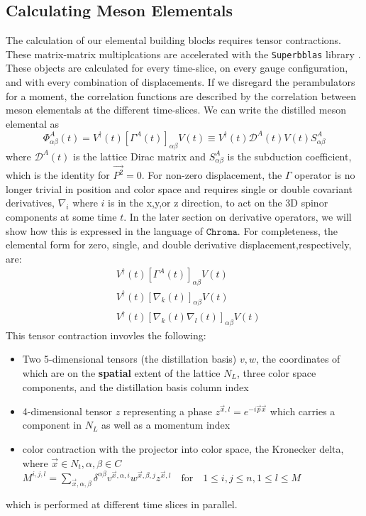 \subsection{Calculating Meson Elementals}
The calculation of our elemental building blocks requires tensor contractions. These matrix-matrix multiplcations are accelerated with the \texttt{Superbblas} library \cite{dinapoli2013efficientuseblaslibrary}. These objects are calculated for every time-slice, on every gauge configuration, and with every combination of displacements. If we disregard the perambulators for a moment, the correlation functions are described by the correlation between meson elementals at the different time-slices. We can write the distilled meson elemental as 
\begin{equation}
\Phi^A_{\alpha\beta}(t) = V^{\dagger}(t) [\Gamma^A(t)]_{\alpha\beta} V(t) \equiv V^{\dagger}(t)\mathcal{D}^A(t)V(t)S^A_{\alpha\beta}
\end{equation} where $\mathcal{D}^A(t)$ is the lattice Dirac matrix and $S^A_{\alpha\beta}$ is the subduction coefficient, which is the identity for $\vec{P^2} = 0$.
For non-zero displacement, the $\Gamma$ operator is no longer trivial in position and color space and requires single or double covariant derivatives, $\nabla_i$ where $i$ is in the x,y,or z direction, to act on the 3D spinor components at some time $t$. In the later section on derivative operators, we will show how this is expressed in the language of $\texttt{Chroma}$. For completeness, the elemental form for zero, single, and double derivative displacement,respectively, are: 
\begin{eqnarray}
  & V^{\dagger}(t) [\Gamma^A(t)]_{\alpha\beta} V(t) \\ 
  & V^{\dagger}(t) [\nabla_k(t)]_{\alpha\beta} V(t) \\ 
  & V^{\dagger}(t) [\nabla_k(t)\nabla_l(t)]_{\alpha\beta} V(t)
\end{eqnarray}
This tensor contraction invovles the following\cite{romero_efficient_2020}: 
\begin{itemize}
  \item Two 5-dimensional tensors (the distillation basis) $v,w$, the coordinates of which are on the \textbf{spatial} extent of the lattice $N_L$, three color space components, and the distillation basis column index 
  \item  4-dimensional tensor $z$ representing a phase $z^{\vec{x},l} = e^{-i\vec{p}\vec{x}}$ which carries a component in $N_L$ as well as a momentum index
  \item color contraction with the projector into color space, the Kronecker delta, where $\vec{x}\in N_t,\alpha,\beta \in C$
  \subitem $ M^{i,j,l} = \sum_{\vec{x},\alpha,\beta} \delta^{\alpha\beta} v^{\vec{x},\alpha,i}w^{\vec{x},\beta,j} z^{\vec{x},l} \quad \text{for} \quad 1\leq i,j \leq n, 1\leq l \leq M$ 
\end{itemize}
which is performed at different time slices in parallel. 

